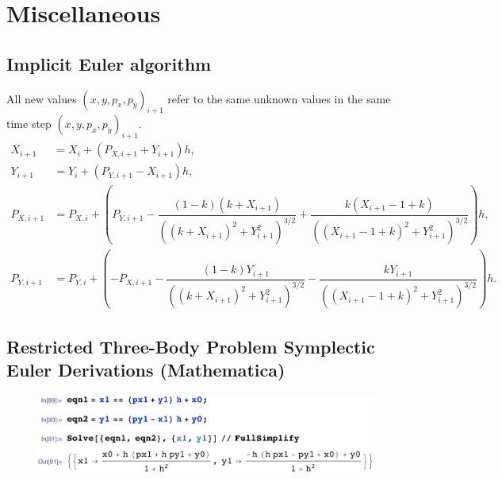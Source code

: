 \chapter{Miscellaneous} \label{app:misc}

\section{Implicit Euler algorithm} \label{app:implicit_euler}
All new values $(x,y,p_x,p_y)_{i+1}$ refer to the same unknown values in the same time step $(x,y,p_x,p_y)_{i+1}$.
\begin{align}
    X_{i+1} &= X_i + (P_{X,i+1} + Y_{i+1})h, \\[0.2cm]
    Y_{i+1} &= Y_i + (P_{Y,i+1} - X_{i+1})h , \\[0.2cm]
    P_{X,i+1} &= P_{X,i} + \left(P_{Y,i+1} - \dfrac{(1-k)(k+X_{i+1})}{((k+X_{i+1})^2+Y_{i+1}^2)^{3/2}} + \dfrac{k(X_{i+1}-1+k)}{((X_{i+1}-1+k)^2+Y_{i+1}^2)^{3/2}}\right)h, \\[0.2cm]
    P_{Y,i+1} &= P_{Y,i} + \left(-P_{X,i+1} - \dfrac{(1-k)Y_{i+1}}{((k+X_{i+1})^2+Y_{i+1}^2)^{3/2}} - \dfrac{k Y_{i+1}}{((X_{i+1}-1+k)^2+Y_{i+1}^2)^{3/2}}\right)h.
\end{align}

\section{Restricted Three-Body Problem Symplectic Euler Derivations (Mathematica)} \label{app:r3b-symplectic-euler}
\begin{figure}[h!]
\centering 
\includegraphics[scale=0.8]{appendices/Miscellaneous/symplectic_euler_derivation.pdf}
\end{figure}

